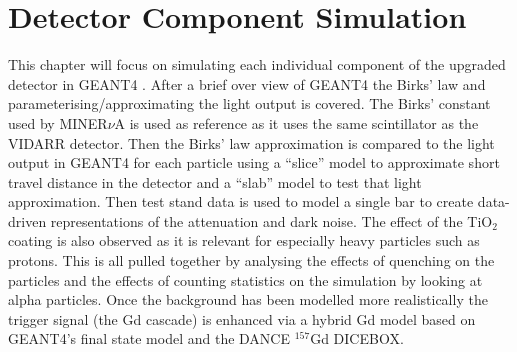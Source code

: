 

\chapter{Detector Component Simulation}\label{chp:GEANT4Simulation}
\ifpdf
    \graphicspath{{Chapter4/Figs/Raster/}{Chapter4/Figs/PDF/}{Chapter4/Figs/}}
\else
    \graphicspath{{Chapter4/Figs/Vector/}{Chapter4/Figs/}}
\fi

This chapter will focus on simulating each individual component of the upgraded detector in GEANT4 \cite{Agostinelli:2002hh}. After a brief over view of GEANT4 the Birks' law and parameterising/approximating the light output is covered. The Birks' constant used by MINER$\nu$A is used as reference as it uses the same scintillator as the VIDARR detector. Then the Birks' law approximation is compared to the light output in GEANT4 for each particle using a ``slice'' model to approximate short travel distance in the detector and a ``slab'' model to test that light approximation. Then test stand data is used to model a single bar to create data-driven representations of the attenuation and dark noise. The effect of the TiO$_2$ coating is also observed as it is relevant for especially heavy particles such as protons. This is all pulled together by analysing the effects of quenching on the particles and the effects of counting statistics on the simulation by looking at alpha particles. Once the background has been modelled more realistically the trigger signal (the Gd cascade) is enhanced via a hybrid Gd model based on GEANT4's final state model and the DANCE $^{157}$Gd DICEBOX. 

